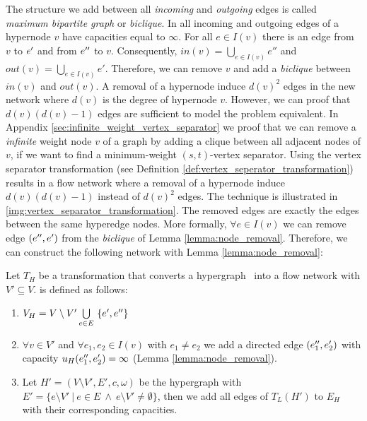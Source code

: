 The structure we add between all \emph{incoming} and \emph{outgoing} edges is called 
\emph{maximum bipartite graph} or \emph{biclique}.
In  all incoming and outgoing edges of a hypernode $v$ have
capacities equal to $\infty$. For all $e \in I(v)$ there is an edge from $v$
to $e'$ and from $e''$ to $v$. Consequently, $in(v) = \bigcup_{e \in I(v)} e''$
and $out(v) = \bigcup_{e \in I(v)} e'$. Therefore, we can remove $v$ and add a \emph{biclique}
between $in(v)$ and $out(v)$. A removal of a hypernode induce $d(v)^2$ edges in the new network where
$d(v)$ is the degree of hypernode $v$. However, we can proof that $d(v)(d(v) - 1)$ edges are
sufficient to model the problem equivalent. In Appendix \ref{sec:infinite_weight_vertex_separator} we
proof that we can remove a \emph{infinite} weight node $v$ of a graph by adding a clique between 
all adjacent nodes of $v$, if we want to find a  minimum-weight $(s,t)$-vertex separator. 
Using the vertex separator transformation (see Definition \ref{def:vertex_seperator_transformation}) 
results in a flow network where a removal of a hypernode induce $d(v)(d(v)-1)$ instead of 
$d(v)^2$ edges. The technique is illustrated in \autoref{img:vertex_separator_transformation}.
The removed edges are exactly the edges between the same hyperedge nodes. More formally,
$\forall e \in I(v)$ we can remove edge $(e'',e')$ from the \emph{biclique}
of Lemma \ref{lemma:node_removal}. Therefore, we can construct the
following network with Lemma \ref{lemma:node_removal}:

\begin{definition}
Let $T_H$ be a transformation that converts a hypergraph \HypergraphDef~into 
a flow network  with $V' \subseteq V$.  is defined as follows:
\begin{enumerate}
\item $V_H = V\setminus V' \bigcup\limits_{e \in E}\ \{e', e''\}$
\item $\forall v \in V'$ and $\forall e_1,e_2 \in I(v)$ with $e_1 \neq e_2$ we add a directed
      edge $(e_1'',e_2')$ with capacity $u_H(e_1'',e_2') = \infty$
      (Lemma \ref{lemma:node_removal}).
\item Let $H' = (V\setminus V',E',c,\omega)$ be the hypergraph with 
      $E' = \{e\setminus V' \ |\ e \in E\ \land \ e \setminus V' \neq \emptyset \}$,
      then we add all edges of $T_L(H')$ to $E_H$ with their corresponding capacities.
\end{enumerate} 
\end{definition}

